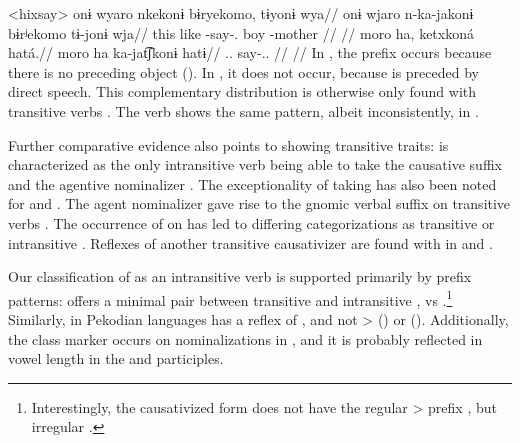 \pex<hixsay>\hixka
{}
\begingl
\glpreamble onɨ wyaro nkekonɨ bɨryekomo, tɨyonɨ wya//
\gla onɨ wjaro n-ka-jakonɨ bɨrʲekomo tɨ-jonɨ wja//
\glb this like -say-. boy -mother //
\glft {} \parencite[][36]{hixkaryanaderby1985}//
\endgl
{}
\begingl
\glpreamble moro ha, ketxkoná hatá.//
\gla moro ha ka-jat͡ʃkonɨ hatɨ//
\glb {}..  say-.. //
\glft {} \parencite[][14]{derbyshire1965textos}//
\endgl
\xe
In , the prefix  occurs because there is no preceding object ().
In , it does not occur, because  is preceded by direct speech.
This complementary distribution is otherwise only found with transitive verbs \parencite[59--60]{gildea1998}.
The verb shows the same pattern, albeit inconsistently, in \trio \parencite[267]{triocarlin2004}.

Further comparative evidence also points to   showing transitive traits:
\trio {} is characterized as the only intransitive verb being able to take the causative suffix  and the agentive nominalizer  \parencite[263, 169]{triomeira1999}.
The exceptionality of   taking   has also been noted for \kalina \parencite[82]{courtz2008carib} and \wayana \parencite[258]{wayanatavares2005}.
The agent nominalizer  gave rise to the \panare gnomic verbal suffix  on transitive verbs \parencite[184--185]{gildea1998}.
The occurrence of  on  has led to differing categorizations as transitive \parencite[214]{panarepayne2013} or intransitive \parencite[102]{mattei1994diccionario}.
Reflexes of another transitive causativizer  \parencite{gildea2015valency} are found with  in \apalai \parencite[51]{koehn1986apalai} and \waiwai \parencite[52]{waiwaihawkins1998}.

Our classification of  as an intransitive verb is supported primarily by prefix patterns:
\kalina offers a minimal pair between transitive   and intransitive  ,   vs   \parencite[288, 45]{courtz2008carib}.\footnote{Interestingly, the \kalina causativized form   does not have the regular > prefix , but irregular  \parencite[430]{courtz2008carib}.}
Similarly,  in Pekodian languages has a reflex of   , and not >  (\bakairi) or  (\PXin).
Additionally, the  class marker  occurs on nominalizations in \kalina {}, and it is probably reflected in vowel length in the \trio \parencite[333]{triomeira1999} and \wayana \parencite[196]{wayanatavares2005} participles.

